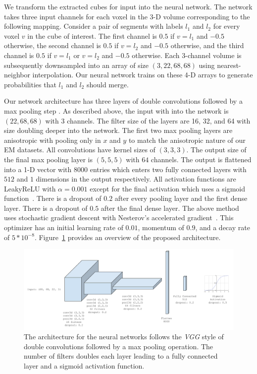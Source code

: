 We transform the extracted cubes for input into the neural network. 
The network takes three input channels for each voxel in the 3-D volume corresponding to the following mapping. 
Consider a pair of segments with labels $l_1$ and $l_2$ for every voxel $v$ in the cube of interest. 
The first channel is $0.5$ if $v = l_1$ and $-0.5$ otherwise, the second channel is $0.5$ if $v = l_2$ and $-0.5$ otherwise, and the third channel is $0.5$ if $v = l_1$ or $v = l_2$ and $-0.5$ otherwise. 
Each 3-channel volume is subsequently downsampled into an array of size $(3, 22, 68, 68)$ using nearest-neighbor interpolation. 
Our neural network trains on these 4-D arrays to generate probabilities that $l_1$ and $l_2$ should merge.

Our network architecture has three layers of double convolutions followed by a max pooling step \cite{chatfield2014return}. 
As described above, the input with into the network is $(22, 68, 68)$ with $3$ channels. 
The filter size of the layers are 16, 32, and 64 with size doubling deeper into the network. 
The first two max pooling layers are anisotropic with pooling only in $x$ and $y$ to match the anisotropic nature of our EM datasets. 
All convolutions have kernel sizes of $(3, 3, 3)$. 
The output size of the final max pooling layer is $(5, 5, 5)$ with $64$ channels. 
The output is flattened into a 1-D vector with $8000$ entries which enters two fully connected layers with $512$ and $1$ dimensions in the output respectively. 
All activation functions are LeakyReLU with $\alpha=0.001$ except for the final activation which uses a sigmoid function~\cite{funahashi1989approximate,maas2013rectifier}. 
There is a dropout of $0.2$ after every pooling layer and the first dense layer. 
There is a dropout of $0.5$ after the final dense layer. 
The above method uses stochastic gradient descent with Nesterov's accelerated gradient~\cite{nesterov1983method}. 
This optimizer has an initial learning rate of $0.01$, momentum of $0.9$, and a decay rate of $5*10^{-8}$. Figure~\ref{fig:architecture} provides an overview of the proposed architecture. 

\begin{figure}[t]
	\centering
	\includegraphics[width=0.95\linewidth]{figures/architecture.png}
	\caption{The architecture for the neural networks follows the \textit{VGG} style of double convolutions followed by a max pooling operation. The number of filters doubles each layer leading to a fully connected layer and a sigmoid activation function.}
	\label{fig:architecture}
\end{figure}


